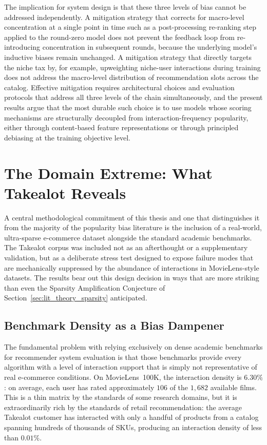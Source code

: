 \documentclass[11pt,a4paper]{report}
\begin{document}
The implication for system design is that these three levels of bias cannot be addressed independently. A mitigation strategy that corrects for macro-level concentration at a single point in time such as a post-processing re-ranking step applied to the round-zero model does not prevent the feedback loop from re-introducing concentration in subsequent rounds, because the underlying model's inductive biases remain unchanged. A mitigation strategy that directly targets the niche tax by, for example, upweighting niche-user interactions during training does not address the macro-level distribution of recommendation slots across the catalog. Effective mitigation requires architectural choices and evaluation protocols that address all three levels of the chain simultaneously, and the present results argue that the most durable such choice is to use models whose scoring mechanisms are structurally decoupled from interaction-frequency popularity, either through content-based feature representations or through principled debiasing at the training objective level.

\section{The Domain Extreme: What Takealot Reveals}
\label{sec:disc_domain}

A central methodological commitment of this thesis and one that distinguishes it from the majority of the popularity bias literature is the inclusion of a real-world, ultra-sparse e-commerce dataset alongside the standard academic benchmarks. The Takealot corpus was included not as an afterthought or a supplementary validation, but as a deliberate stress test designed to expose failure modes that are mechanically suppressed by the abundance of interactions in MovieLens-style datasets. The results bear out this design decision in ways that are more striking than even the Sparsity Amplification Conjecture of Section~\ref{sec:lit_theory_sparsity} anticipated.

\subsection*{Benchmark Density as a Bias Dampener}

The fundamental problem with relying exclusively on dense academic benchmarks for recommender system evaluation is that those benchmarks provide every algorithm with a level of interaction support that is simply not representative of real e-commerce conditions. On MovieLens~100K, the interaction density is $6.30\%$: on average, each user has rated approximately $106$ of the $1{,}682$ available films. This is a thin matrix by the standards of some research domains, but it is extraordinarily rich by the standards of retail recommendation: the average Takealot customer has interacted with only a handful of products from a catalog spanning hundreds of thousands of SKUs, producing an interaction density of less than $0.01\%$.
\end{document}
